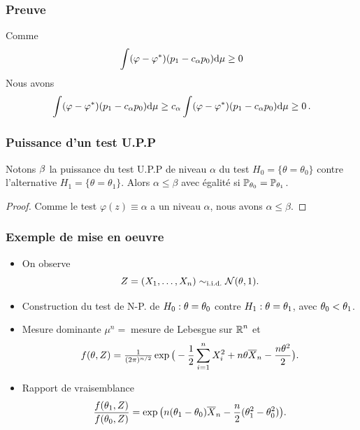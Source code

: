 \begin{frame}
\frametitle{Preuve}
{Comme
$$
\int (\varphi - \varphi^*) (p_1 - c_\alpha p_0) \mathrm{d} \mu \geq 0
$$
Nous avons
$$
\int (\varphi - \varphi^*) (p_1 - c_\alpha p_0) \mathrm{d} \mu \geq c_\alpha \int (\varphi - \varphi^*) (p_1 - c_\alpha p_0) \mathrm{d} \mu \geq 0 \,.
$$
}
\end{frame}

\begin{frame}
\frametitle{Puissance d'un test U.P.P}
\begin{lemma}
Notons $\beta$ la puissance du test U.P.P de niveau $\alpha$ du test $H_0= \{\theta = \theta_0\}$ contre l'alternative $H_1= \{\theta=\theta_1\}$. Alors $\alpha \leq \beta$ avec égalité si $\operatorname{{\mathbb P}}_{\theta_0}= \operatorname{{\mathbb P}}_{\theta_1}$.
\end{lemma}
\begin{proof}
Comme le test $\varphi(z) \equiv \alpha$ a un niveau $\alpha$, nous avons $\alpha \leq \beta$.
\end{proof}
\end{frame}

\begin{frame}
\frametitle{Exemple de mise en oeuvre}
\begin{itemize}
\item On observe
$$Z=(X_1,\ldots, X_n) \sim_{\text{i.i.d.}} {\mathcal N}(\theta, 1).$$
\item \alert{Construction du test de N-P.} de $H_0:\theta = \theta_0$ contre $H_1:\theta = \theta_1$, avec $\theta_0 < \theta_1$.
\item \alert{Mesure dominante} $\mu^n=\;$mesure de Lebesgue sur $\operatorname{{\mathbb R}}^n$ et
$$f(\theta, Z)=\tfrac{1}{(2\pi)^{n/2}}\exp\big(-\frac{1}{2}\sum_{i = 1}^n X_i^2+n\theta\overline{X}_n-\frac{n\theta^2}{2}\big).$$
\item \alert{Rapport de vraisemblance}
$$\frac{f(\theta_1,Z)}{f(\theta_0,Z)} = \exp\big(n(\theta_1-\theta_0)\overline{X}_n-\frac{n}{2}(\theta_1^2-\theta_0^2)\big).$$
\end{itemize}
\end{frame}

